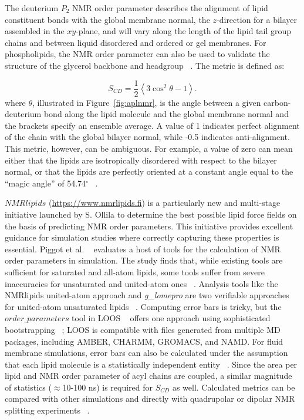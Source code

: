 \documentclass[9pt,bestpractices,pubversion]{livecoms}
\begin{document}
The deuterium $P_2$ NMR order parameter describes the alignment of lipid constituent bonds with the global membrane normal, the $z$-direction for a bilayer assembled in the $xy$-plane, and will vary along the length of the lipid tail group chains and between liquid disordered and ordered or gel membranes.
For phospholipids, the NMR order parameter can also be used to validate the structure of the glycerol backbone and headgroup ~\cite{Botan2015}.
The metric is defined as:

\begin{equation}\label{eq:6}
	S_{CD}=\frac{1}{2} \left<3\cos^2\theta-1 \right>.
\end{equation}
where $\theta$, illustrated in Figure~\ref{fig:aplnmr}, is the angle between a given carbon-deuterium bond along the lipid molecule and the global membrane normal and the brackets specify an ensemble average.
A value of 1 indicates perfect alignment of the chain with the global bilayer normal, while -0.5 indicates anti-alignment.
This metric, however, can be ambiguous.
For example, a value of zero can mean either that the lipids are isotropically disordered with respect to the bilayer normal, or that the lipids are perfectly oriented at a constant angle equal to the ``magic angle'' of 54.74$^{\circ}$ ~\cite{Poger2016}.

$NMRlipids$ (\url{https://www.nmrlipids.fi}) is a particularly new and multi-stage initiative launched by S. Ollila to determine the best possible lipid force fields on the basis of predicting NMR order parameters.
This initiative provides excellent guidance for simulation studies where correctly capturing these properties is essential.
Piggot et al. ~\cite{Piggot2017a} evaluates a host of tools for the calculation of NMR order parameters in simulation.
The study finds that, while existing tools are sufficient for saturated and all-atom lipids, some tools suffer from severe inaccuracies for unsaturated and united-atom ones ~\cite{Piggot2017a}.
Analysis tools like the NMRlipids united-atom approach and \textit{g\_lomepro} are two verifiable approaches for united-atom unsaturated lipids ~\cite{Piggot2017a}.
Computing error bars is tricky, but the $order\_parameters$ tool in LOOS ~\cite{Romo2009} offers one approach using sophisticated bootstrapping ~\cite{Romo2011}; LOOS is compatible with files generated from multiple MD packages, including AMBER, CHARMM, GROMACS, and NAMD.
For fluid membrane simulations, error bars can also be calculated under the assumption that each lipid molecule is a statistically independent entity ~\cite{Botan2015}.
Since the area per lipid and NMR order parameter of acyl chains are coupled, a similar magnitude of statistics ($\approx$10-100 ns) is required for $S_{CD}$ as well.
Calculated metrics can be compared with other simulations and directly with quadrupolar or dipolar NMR splitting experiments ~\cite{Ollila2016}.
\end{document}
